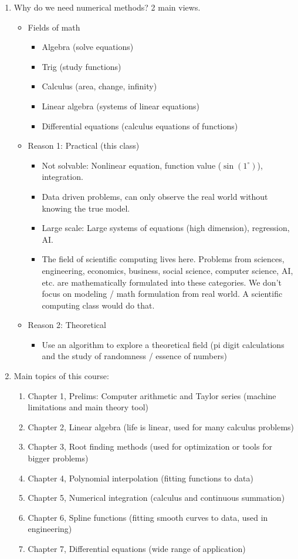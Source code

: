 \documentclass{article}
\theoremstyle{remark}
\begin{document}
\begin{enumerate}
\item Why do we need numerical methods? 2 main views.
\begin{itemize}
\item Fields of math 
\begin{itemize}
\item Algebra (solve equations)
\item Trig (study functions)
\item Calculus (area, change, infinity)
\item Linear algebra (systems of linear equations)
\item Differential equations (calculus equations of functions)
\end{itemize}
\item Reason 1: Practical (this class)
\begin{itemize}
\item Not solvable: Nonlinear equation, function value ($\sin(1^{\circ})$), integration.
\item Data driven problems, can only observe the real world without knowing the true model.
\item Large scale: Large systems of equations (high dimension), regression, AI.
\item The field of scientific computing lives here. Problems from sciences, engineering, economics, business, social science, computer science, AI, etc. are mathematically formulated into these categories. We don't focus on modeling / math formulation from real world. A scientific computing class would do that.
\end{itemize}
\item Reason 2: Theoretical
\begin{itemize}
\item Use an algorithm to explore a theoretical field (pi digit calculations and the study of randomness / essence of numbers)
\end{itemize}
\end{itemize}

\item Main topics of this course: 
\begin{enumerate}
\item Chapter 1, Prelims: Computer arithmetic and Taylor series (machine limitations and main theory tool)
\item Chapter 2, Linear algebra (life is linear, used for many calculus problems) 
\item Chapter 3, Root finding methods (used for optimization or tools for bigger problems)
\item Chapter 4, Polynomial interpolation (fitting functions to data)
\item Chapter 5, Numerical integration (calculus and continuous summation)
\item Chapter 6, Spline functions (fitting smooth curves to data, used in engineering)
\item Chapter 7, Differential equations (wide range of application)
\end{enumerate}


\end{enumerate}
\end{document}

